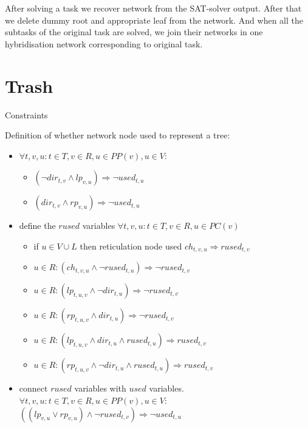 \documentclass[runningheads, envcountsame, a4paper]{llncs}
\begin{document}
After solving a task we recover network from the SAT-solver output. After that we delete dummy root and appropriate leaf from the network. And when all the subtasks of the original task are solved, we join their networks in one hybridisation network corresponding to original task.

\section{Trash}

Constraints

Definition of whether network node used to represent a tree:
\begin{itemize}
\item $\forall t, v, u: t \in T, v \in R, u \in PP(v), u \in V$:
    \begin{itemize}
    \item $(\neg dir_{t,v} \wedge lp_{v,u}) \Rightarrow \neg used_{t,u}$ 
    \item $(dir_{t,v} \wedge rp_{v,u}) \Rightarrow \neg used_{t,u}$ 
    \end{itemize}
\item define the $rused$ variables $\forall t, v, u: t \in T, v \in R, u \in PC(v)$
    \begin{itemize}
    \item if $u \in V \cup L$ then reticulation node used $ch_{t,v,u} \Rightarrow rused_{t,v}$
    \item $u \in R : (ch_{t,v,u} \wedge \neg rused_{t,u}) \Rightarrow \neg rused_{t,v}$

    \item $u \in R : (lp_{t,u,v} \wedge \neg dir_{t,u}) \Rightarrow \neg rused_{t,v}$
    \item $u \in R : (rp_{t,u,v} \wedge dir_{t,u}) \Rightarrow \neg rused_{t,v}$

    \item $u \in R : (lp_{t,u,v} \wedge dir_{t,u} \wedge rused_{t,u}) \Rightarrow rused_{t,v}$
    \item $u \in R : (rp_{t,u,v} \wedge \neg dir_{t,u} \wedge rused_{t,u}) \Rightarrow rused_{t,v}$
    \end{itemize}
\item connect $rused$ variables with $used$ variables. $\forall t, v, u: t \in T, v \in R, u \in PP(v), u \in V$:
    $((lp_{v,u} \vee rp_{v,u}) \wedge \neg rused_{t,v}) \Rightarrow \neg used_{t,u}$
\end{itemize}
\end{document}
